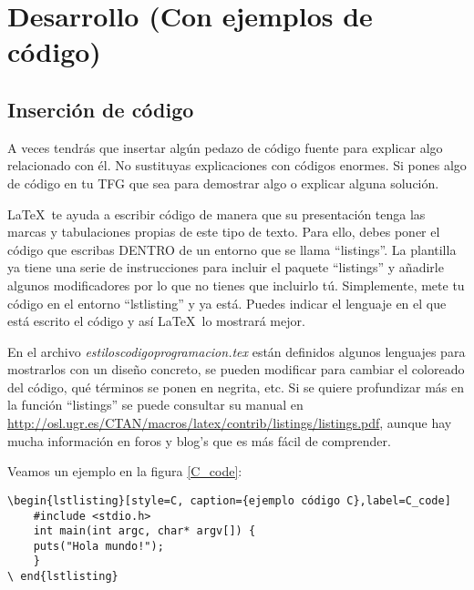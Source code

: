 


\chapter{Desarrollo (Con ejemplos de código)}
\label{desarrollo}

\section{Inserción de código}
A veces tendrás que insertar algún pedazo de código fuente para explicar algo relacionado con él. No sustituyas explicaciones con códigos enormes. Si pones algo de código en tu TFG que sea para demostrar algo o explicar alguna solución.

\LaTeX~te ayuda a escribir código de manera que su presentación tenga las marcas y tabulaciones propias de este tipo de texto. Para ello, debes poner el código que escribas DENTRO de un entorno  que se llama ``listings''.  La plantilla ya tiene una serie de instrucciones para incluir el paquete ``listings'' y añadirle algunos modificadores por lo que no tienes que incluirlo tú. Simplemente, mete tu código en el entorno ``lstlisting'' y ya está. Puedes indicar el lenguaje en el que está escrito el código y así \LaTeX~lo mostrará mejor. 
\\
\par En el archivo \textit{estiloscodigoprogramacion.tex} están definidos algunos lenguajes para mostrarlos con un diseño concreto, se pueden modificar para cambiar el coloreado del código, qué términos se ponen en negrita, etc.
Si se quiere profundizar más en la función ``listings'' se puede consultar su manual en \url{http://osl.ugr.es/CTAN/macros/latex/contrib/listings/listings.pdf}, aunque hay mucha información en foros y blog's que es más fácil de comprender.

\par Veamos un ejemplo en la figura \ref{C_code}:

\begin{lstlisting}[style=Latex-color]
\begin{lstlisting}[style=C, caption={ejemplo código C},label=C_code]
	#include <stdio.h>
	int main(int argc, char* argv[]) {
  	puts("Hola mundo!");
	}
\ end{lstlisting}	
\end{lstlisting}

